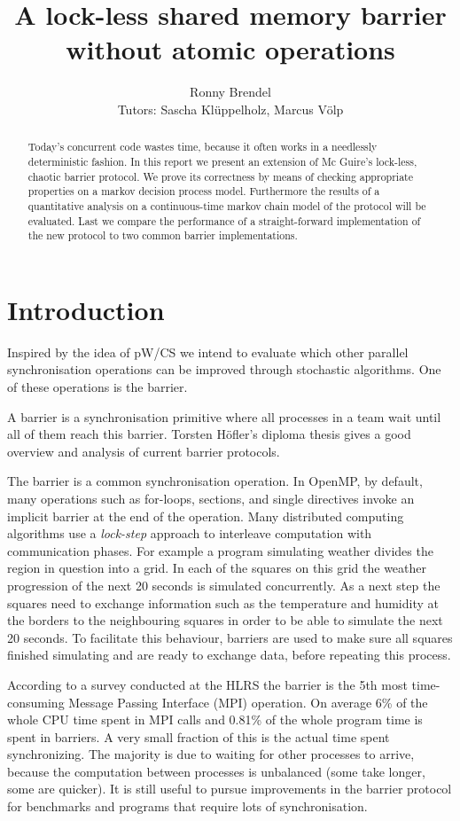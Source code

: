 \documentclass[a4paper, 10pt]{article}
\title{A lock-less shared memory barrier without atomic operations}
\author{Ronny Brendel\\Tutors: Sascha Kl\"uppelholz, Marcus V\"olp}
\begin{document}
\maketitle

\begin{abstract}
Today's concurrent code wastes time, because it often works in a needlessly deterministic fashion. In this report we present an extension of Mc Guire's lock-less, chaotic barrier protocol. We prove its correctness by means of checking appropriate properties on a markov decision process model. Furthermore the results of a quantitative analysis on a continuous-time markov chain model of the protocol will be evaluated. Last we compare the performance of a straight-forward implementation of the new protocol to two common barrier implementations.
\end{abstract}

\section{Introduction}
Inspired by the idea of pW/CS\cite{pwcs} we intend to evaluate which other parallel synchronisation operations can be improved through stochastic algorithms. One of these operations is the barrier.

A barrier is a synchronisation primitive where all processes in a team wait until all of them reach this barrier. Torsten H\"ofler's diploma thesis\cite{hoefler2005} gives a good overview and analysis of current barrier protocols.

The barrier is a common synchronisation operation. In OpenMP\cite{omp}, by default, many operations such as for-loops, sections, and single directives invoke an implicit barrier at the end of the operation. Many distributed computing algorithms use a \emph{lock-step} approach to interleave computation with communication phases. For example a program simulating weather divides the region in question into a grid. In each of the squares on this grid the weather progression of the next 20 seconds is simulated concurrently. As a next step the squares need to exchange information such as the temperature and humidity at the borders to the neighbouring squares in order to be able to simulate the next 20 seconds. To facilitate this behaviour, barriers are used to make sure all squares finished simulating and are ready to exchange data, before repeating this process.

According to a survey conducted at the HLRS\cite{rab00} the barrier is the 5th most time-consuming Message Passing Interface (MPI)\cite{mpi} operation. On average 6\% of the whole CPU time spent in MPI calls and 0.81\% of the whole program time is spent in barriers. A very small fraction of this is the actual time spent synchronizing. The majority is due to waiting for other processes to arrive, because the computation between processes is unbalanced (some take longer, some are quicker). It is still useful to pursue improvements in the barrier protocol for benchmarks and programs that require lots of synchronisation.
\end{document}
